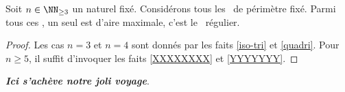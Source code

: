 \begin{fact}
    Soit $n \in \NN_{\geq3}$ un naturel fixé.
    Considérons tous les \ngones\  de périmètre fixé. Parmi tous ces \ngones, un seul est d'aire maximale, c'est le \ngone\ régulier.
\end{fact}


\begin{proof}
	Les cas $n = 3$ et $n = 4$ sont donnés par les faits \ref{iso-tri} et \ref{quadri}.
	Pour $n \geq 5 $, il suffit d'invoquer les faits \ref{XXXXXXXX} et \ref{YYYYYYY}.
\end{proof}

\bigskip
\hfill {\small\itshape\bfseries Ici s'achève notre joli voyage}.